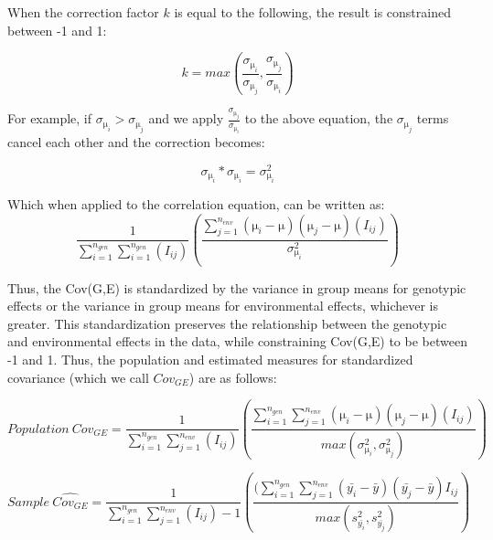 \documentclass[11pt, oneside]{amsart}
\begin{document}
When the correction factor $k$ is equal to the following, the result is constrained between -1 and 1:

\begin{equation}
k = max(\frac{\sigma_{\si\micro_{i}}}{\sigma_{\si\micro_{j}}},\frac{\sigma_{\si\micro_{j}}}{\sigma_{\si\micro_{i}}})
\end{equation}

For example, if $\sigma_{\si\micro_{i}} > \sigma_{\si\micro_{j}}$ and we apply $\frac{\sigma_{\si\micro_{j}}}{\sigma_{\si\micro_{i}}}$ to the above equation, the $\sigma_{\si\micro_{j}}$ terms cancel each other and the correction becomes: 

\begin{equation}
\sigma_{\si\micro_{i}} * \sigma_{\si\micro_{i}}= \sigma^2_{\si\micro_{i}}
\end{equation}


Which when applied to the correlation equation, can be written as: 
\begin{equation}
 \frac{1}{ \sum_{i=1}^{n_{gen}}  \sum_{i=1}^{n_{gen}}(I_{ij})} (\frac {\sum_{j=1}^{n_{env}}(\si\micro_{i} - \si\micro)(\si\micro_{j} - \si\micro)(I_{ij})}{\sigma^2_{\si\micro_{i}}})
\end{equation}

Thus, the Cov(G,E) is standardized by the variance in group means for genotypic effects or the variance in group means for environmental effects, whichever is greater. This standardization preserves the relationship between the genotypic and environmental effects in the data, while constraining Cov(G,E) to be between -1 and 1.
Thus, the population and estimated measures for standardized covariance (which we call $Cov_{GE}$) are as follows: 

\begin{equation}
Population\:  Cov_{GE} =   \frac{1}{ \sum_{i=1}^{n_{gen}}  \sum_{j=1}^{n_{env}}(I_{ij})}(\frac{\sum_{i=1}^{n_{gen}} \sum_{j=1}^{n_{env}}(\si\micro_{i} - \si\micro)(\si\micro_{j} - \si\micro)(I_{ij})}{max(\sigma^2_{\si\micro_{i}},\sigma^2_{\si\micro_{j}})})
\end{equation}

\begin{equation}
Sample\: \hat{Cov_{GE}} = \frac{1}{ \sum_{i=1}^{n_{gen}}  \sum_{j=1}^{n_{env}}(I_{ij})-1}(\frac{ (\sum_{i=1}^{n_{gen}}  \sum_{j=1}^{n_{env}}(\bar{y_{i}}-\bar{y})(\bar{y_{j}}-\bar{y})I_{ij}}{max( s^2_{\bar{y_{i}}}, s^2_{\bar{y_{j}}})})
\end{equation}
\end{document}
